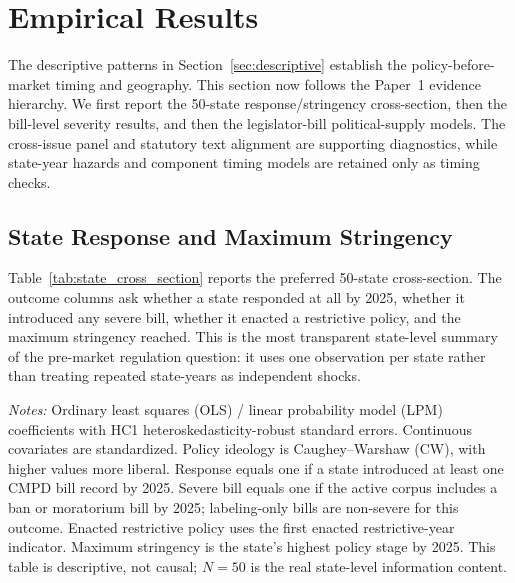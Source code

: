\documentclass[12pt]{article}
\begin{document}
\section{Empirical Results}
\label{sec:results}

The descriptive patterns in Section~\ref{sec:descriptive} establish the policy-before-market timing and geography.  This section now follows the Paper~1 evidence hierarchy.  We first report the 50-state response/stringency cross-section, then the bill-level severity results, and then the legislator-bill political-supply models.  The cross-issue panel and statutory text alignment are supporting diagnostics, while state-year hazards and component timing models are retained only as timing checks.

\subsection{State Response and Maximum Stringency}
\label{sec:results_state_response}

Table~\ref{tab:state_cross_section} reports the preferred 50-state cross-section.  The outcome columns ask whether a state responded at all by 2025, whether it introduced any severe bill, whether it enacted a restrictive policy, and the maximum stringency reached.  This is the most transparent state-level summary of the pre-market regulation question: it uses one observation per state rather than treating repeated state-years as independent shocks.

\begin{table}[htbp]
\centering
\begin{threeparttable}
\caption{State Response and Maximum Stringency by 2025}
\label{tab:state_cross_section}
\footnotesize

\begin{tablenotes}[flushleft]
\footnotesize
\item \textit{Notes:} Ordinary least squares (OLS) / linear probability model (LPM) coefficients with HC1 heteroskedasticity-robust standard errors.  Continuous covariates are standardized.  Policy ideology is Caughey--Warshaw (CW), with higher values more liberal.  Response equals one if a state introduced at least one CMPD bill record by 2025.  Severe bill equals one if the active corpus includes a ban or moratorium bill by 2025; labeling-only bills are non-severe for this outcome.  Enacted restrictive policy uses the first enacted restrictive-year indicator.  Maximum stringency is the state's highest policy stage by 2025.  This table is descriptive, not causal; $N=50$ is the real state-level information content.
\end{tablenotes}
\end{threeparttable}
\end{table}
\end{document}
